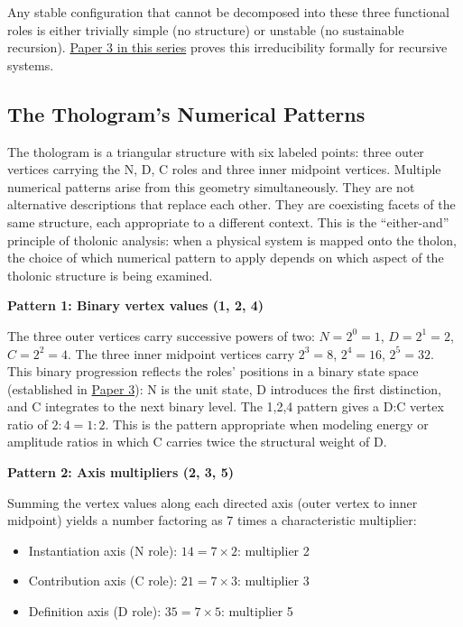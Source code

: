 \documentclass[12pt]{article}
\providecommand{\tightlist}{%
  \setlength{\itemsep}{0pt}\setlength{\parskip}{0pt}}
\begin{document}
Any stable configuration that cannot be decomposed into these three
functional roles is either trivially simple (no structure) or unstable
(no sustainable recursion).
\href{https://github.com/baardev/truevalue/blob/main/docnav/Research/papers/3_minimal-recursive-triadic-framework/3_minimal-recursive-triadic-framework.pdf}{Paper
3 in this series} proves this irreducibility formally for recursive
systems.

\subsection{The Thologram's Numerical Patterns}\label{the-tholograms-numerical-patterns}

The thologram is a triangular structure with six labeled points: three
outer vertices carrying the N, D, C roles and three inner midpoint
vertices. Multiple numerical patterns arise from this geometry
simultaneously. They are not alternative descriptions that replace each
other. They are coexisting facets of the same structure, each
appropriate to a different context. This is the ``either-and'' principle
of tholonic analysis: when a physical system is mapped onto the tholon,
the choice of which numerical pattern to apply depends on which aspect
of the tholonic structure is being examined.

\textbf{Pattern 1: Binary vertex values (1, 2, 4)}

The three outer vertices carry successive powers of two:
\(N = 2^0 = 1\), \(D = 2^1 = 2\), \(C = 2^2 = 4\). The three inner
midpoint vertices carry \(2^3 = 8\), \(2^4 = 16\), \(2^5 = 32\). This
binary progression reflects the roles' positions in a binary state space
(established in
\href{https://github.com/baardev/truevalue/blob/main/docnav/Research/papers/3_minimal-recursive-triadic-framework/3_minimal-recursive-triadic-framework.pdf}{Paper
3}): N is the unit state, D introduces the first distinction, and C
integrates to the next binary level. The 1,2,4 pattern gives a D:C
vertex ratio of \(2:4 = 1:2\). This is the pattern appropriate when
modeling energy or amplitude ratios in which C carries twice the
structural weight of D.

\textbf{Pattern 2: Axis multipliers (2, 3, 5)}

Summing the vertex values along each directed axis (outer vertex to
inner midpoint) yields a number factoring as 7 times a characteristic
multiplier:

\begin{itemize}
\tightlist
\item
  Instantiation axis (N role): \(14 = 7 \times 2\): multiplier 2
\item
  Contribution axis (C role): \(21 = 7 \times 3\): multiplier 3
\item
  Definition axis (D role): \(35 = 7 \times 5\): multiplier 5
\end{itemize}
\end{document}
